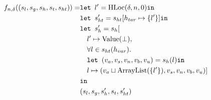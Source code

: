 \begin{align}
    f_{n,\delta}((s_l, s_g, s_h, s_t, s_{ht})) = &\texttt{let } l' = \text{HLoc}(\delta, n, 0) \texttt{in }\notag\\
                              &\texttt{let } s_{ht}' = s_{ht}[h_{tar} \mapsto \{l'\}] \texttt{in }\notag\\
                              &\texttt{let } s_h' = s_h[\notag\\
                              &\quad l' \mapsto \text{Value}(\bot), \notag\\
                              &\quad \forall l \in s_{ht}(h_{var}).\notag\\
                              &\quad\texttt{let } (v_a,v_s,v_n,v_b,v_u) = s_h(l) \texttt{in } \notag\\
                              &\quad l\mapsto (v_a \sqcup \text{ArrayList}(\{l'\}), v_s, v_n, v_b, v_u)]\notag\\
                              & \texttt{in }\notag\\
                              &(s_l, s_g, s_h', s_t, s_{ht}')
\end{align}

